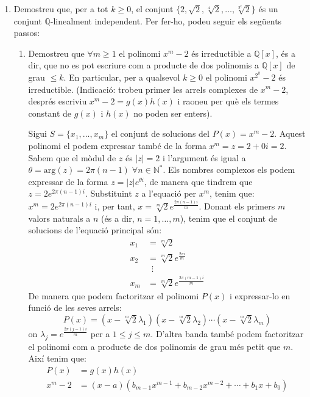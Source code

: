 \documentclass[11pt,a4paper]{article}
\begin{document}
\begin{enumerate}
\begin{enumerate}
        \item Demostreu que, per a tot $k\geq 0$, el conjunt $\{2,\sqrt{2},\sqrt[4]{2},\ldots,\sqrt[2^k]{2}\}$ és un conjunt $\mathbb{Q}$-linealment independent. Per fer-ho, podeu seguir els següents passos:
        \begin{enumerate}
            \item Demostreu que $\forall m\geq 1$ el polinomi $x^m-2$ és irreductible a $\mathbb{Q}[x]$, és a dir, que no es pot escriure com a producte de dos polinomis a $\mathbb{Q}[x]$ de grau $\leq k$. En particular, per a qualsevol $k\geq 0$ el polinomi $x^{2^k}-2$ és irreductible. (Indicació: trobeu primer les arrels complexes de $x^m-2$, després escriviu $x^m-2=g(x)h(x)$ i raoneu per què els termes constant de $g(x)$ i $h(x)$ no poden ser enters).\par
            Sigui $S=\{x_1,\ldots,x_m\}$ el conjunt de solucions del $P(x)=x^m-2$. Aquest polinomi el podem expressar també de la forma $x^m=z=2+0i=2$. Sabem que el mòdul de $z$ és $|z|=2$ i l'argument és igual a $\theta=\text{arg} (z)=2\pi (n-1)\;\forall n\in\mathbb{N}^*$. Els nombres complexos els podem expressar de la forma $z=|z|e^{\theta i}$, de manera que tindrem que $z=2e^{2\pi (n-1)i}$. Substituint $z$ a l'equació per $x^m$, tenim que: $x^m=2e^{2\pi (n-1)i}$ i, per tant, $x=\sqrt[m]{2}e^{\frac{2\pi (n-1)i}{m}}$. Donant els primers $m$ valors naturals a $n$ (és a dir, $n=1,\ldots,m$), tenim que el conjunt de solucions de l'equació principal són:
            \begin{align*}
                x_1&=\sqrt[m]{2}\\
                x_2&=\sqrt[m]{2}e^{\frac{2\pi i}{m}}\\
                &\;\:\vdots\\
                x_m&=\sqrt[m]{2}e^{\frac{2\pi (m-1)i}{m}}
            \end{align*}
            De manera que podem factoritzar el polinomi $P(x)$ i expressar-lo en funció de les seves arrels: $$P(x)=(x-\sqrt[m]{2}\lambda_1)(x-\sqrt[m]{2}\lambda_2)\cdots(x-\sqrt[m]{2}\lambda_m)$$ on $\lambda_j=e^{\frac{2\pi (j-1)i}{m}}$ per a $1\leq j\leq m$. D'altra banda també podem factoritzar el polinomi com a producte de dos polinomis de grau més petit que $m$. Així tenim que:
            \begin{align*}
                P(x)&=g(x)h(x)\\
                x^m-2&=(x-a)(b_{m-1}x^{m-1}+b_{m-2}x^{m-2}+\cdots+b_1x+b_0)
            \end{align*}

\end{enumerate}
\end{enumerate}
\end{enumerate}
\end{document}
